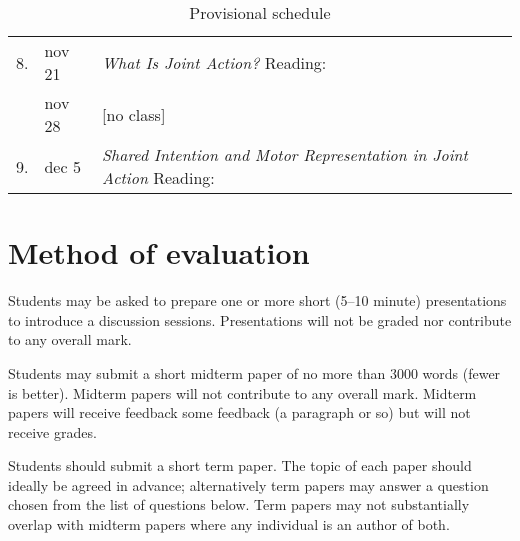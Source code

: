 \documentclass[12pt,\papersize]{extarticle}
\begin{document}
{\begin{table}[htbp]
\begin{center}
\begin{tabular*}{1\textwidth}{ l l m{} }
\\ 8. & nov 21 
	&  \textit{What Is Joint Action?}
		\newline Reading: \citet{Bratman:1992mi,Bratman:1993je,ludwig_collective_2007,Searle:1990em}
\\ & nov 28 & [no class]
\\ 9. & dec 5 
	& \textit{Shared Intention and Motor Representation in Joint Action}
		\newline Reading: \citet{Knoblich:2008hy,kourtis:2010_favoritism}
\\
%
\bottomrule
%
\end{tabular*}
\caption{Provisional schedule}
\label{table:schedule}
\end{center}	%
\end{table}
}



\section{Method of evaluation}

Students may be asked to prepare one or more short (5--10 minute) presentations to introduce a discussion sessions. 
Presentations will not be graded nor contribute to any overall mark. 

Students may submit a short midterm paper of no more than 3000 words (fewer is better).
Midterm papers will not contribute to any overall mark.   
Midterm papers will receive feedback some feedback (a paragraph or so) but will not receive grades.

Students should submit a short term paper.  
The topic of each paper should ideally be agreed in advance; alternatively term papers may answer a question chosen from the list of questions below. 
Term papers may not substantially overlap with midterm papers where any individual is an author of both.
\end{document}

